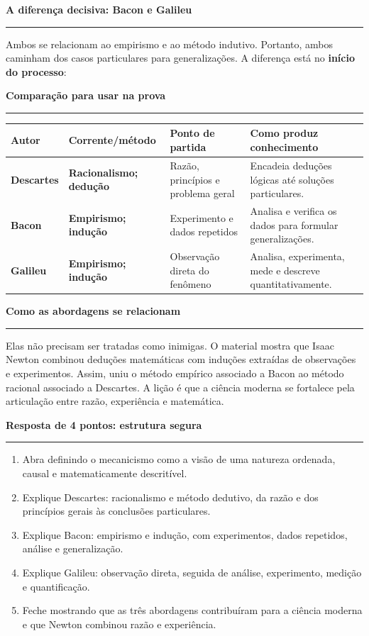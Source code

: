 \documentclass[10pt,a4paper]{article}
\newcommand{\secao}[1]{\vspace{0.75em}\noindent\textcolor{azul}{\Large\textbf{#1}}\par\vspace{0.18em}\hrule\vspace{0.32em}}
\begin{document}
\secao{A diferença decisiva: Bacon e Galileu}

Ambos se relacionam ao empirismo e ao método indutivo. Portanto, ambos caminham dos casos particulares para generalizações. A diferença está no \textbf{início do processo}:

\begin{center}
\end{center}

\newpage
\secao{Comparação para usar na prova}

\renewcommand{\arraystretch}{1.08}
\begin{tabularx}{\linewidth}{>{\bfseries}p{1.9cm}>{\bfseries}p{2.6cm}p{3.2cm}X}
\hline
\rowcolor{azulclaro}Autor & Corrente/método & Ponto de partida & Como produz conhecimento \\
\hline
Descartes & Racionalismo; dedução & Razão, princípios e problema geral & Encadeia deduções lógicas até soluções particulares. \\
Bacon & Empirismo; indução & Experimento e dados repetidos & Analisa e verifica os dados para formular generalizações. \\
Galileu & Empirismo; indução & Observação direta do fenômeno & Analisa, experimenta, mede e descreve quantitativamente. \\
\hline
\end{tabularx}

\secao{Como as abordagens se relacionam}

Elas não precisam ser tratadas como inimigas. O material mostra que Isaac Newton combinou deduções matemáticas com induções extraídas de observações e experimentos. Assim, uniu o método empírico associado a Bacon ao método racional associado a Descartes. A lição é que a ciência moderna se fortalece pela articulação entre razão, experiência e matemática.

\secao{Resposta de 4 pontos: estrutura segura}

\begin{enumerate}[leftmargin=0.7cm,itemsep=0.32em]
\item Abra definindo o mecanicismo como a visão de uma natureza ordenada, causal e matematicamente descritível.
\item Explique Descartes: racionalismo e método dedutivo, da razão e dos princípios gerais às conclusões particulares.
\item Explique Bacon: empirismo e indução, com experimentos, dados repetidos, análise e generalização.
\item Explique Galileu: observação direta, seguida de análise, experimento, medição e quantificação.
\item Feche mostrando que as três abordagens contribuíram para a ciência moderna e que Newton combinou razão e experiência.
\end{enumerate}
\end{document}
